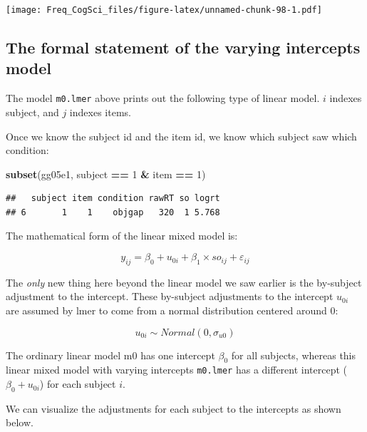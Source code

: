 \documentclass[12pt,]{krantz}
\newenvironment{Shaded}{\begin{snugshade}}{\end{snugshade}}
\newcommand{\DecValTok}[1]{\textcolor[rgb]{0.00,0.00,0.81}{#1}}
\newcommand{\KeywordTok}[1]{\textcolor[rgb]{0.13,0.29,0.53}{\textbf{#1}}}
\newcommand{\NormalTok}[1]{#1}
\newcommand{\OperatorTok}[1]{\textcolor[rgb]{0.81,0.36,0.00}{\textbf{#1}}}
\newcommand{\StringTok}[1]{\textcolor[rgb]{0.31,0.60,0.02}{#1}}
\begin{document}
\texttt{[image: Freq\_CogSci\_files/figure-latex/unnamed-chunk-98-1.pdf]}

\hypertarget{the-formal-statement-of-the-varying-intercepts-model}{%
\subsection{The formal statement of the varying intercepts model}\label{the-formal-statement-of-the-varying-intercepts-model}}

The model \texttt{m0.lmer} above prints out the following type of linear model. \(i\) indexes subject, and \(j\) indexes items.

Once we know the subject id and the item id, we know which subject saw which condition:

\begin{Shaded}
\begin{Highlighting}[]
\KeywordTok{subset}\NormalTok{(gg05e1, subject }\OperatorTok{==}\StringTok{ }\DecValTok{1} \OperatorTok{&}\StringTok{ }\NormalTok{item }\OperatorTok{==}\StringTok{ }\DecValTok{1}\NormalTok{)}
\end{Highlighting}
\end{Shaded}

\begin{verbatim}
##   subject item condition rawRT so logrt
## 6       1    1    objgap   320  1 5.768
\end{verbatim}

The mathematical form of the linear mixed model is:

\begin{equation}
y_{ij} = \beta_0 + u_{0i}+\beta_1\times so_{ij} + \varepsilon_{ij}
\end{equation}

The \emph{only} new thing here beyond the linear model we saw earlier is the by-subject adjustment to the intercept. These by-subject adjustments to the intercept \(u_{0i}\) are assumed by lmer to come from a normal distribution centered around 0:

\begin{equation}
u_{0i} \sim Normal(0,\sigma_{u0})
\end{equation}

The ordinary linear model m0 has one intercept \(\beta_0\) for all subjects, whereas this linear mixed model with varying intercepts \texttt{m0.lmer} has a different intercept (\(\beta_0 + u_{0i}\)) for each subject \(i\).

We can visualize the adjustments for each subject to the intercepts as shown below.
\end{document}
